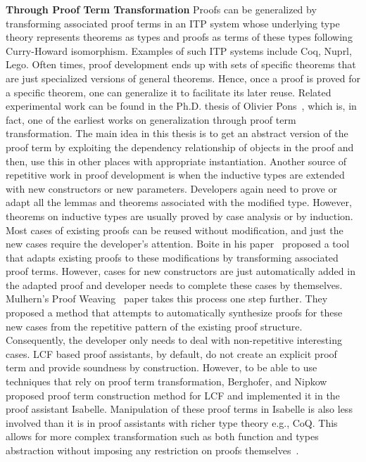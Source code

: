 \textbf{Through Proof Term Transformation} 
Proofs can be generalized by transforming associated proof terms in an ITP system whose underlying type theory represents theorems as types and proofs as terms of these types following Curry-Howard isomorphism. Examples of such ITP systems include Coq, Nuprl, Lego. Often times, proof development ends up with sets of specific theorems that are just specialized versions of general theorems. Hence, once a proof is proved for a specific theorem, one can generalize it to facilitate its later reuse. Related experimental work can be found in the Ph.D. thesis of Olivier Pons~\cite{Pons_1999}, which is, in fact, one of the earliest works on generalization through proof term transformation. The main idea in this thesis is to get an abstract version of the proof term by exploiting the dependency relationship of objects in the proof and then, use this in other places with appropriate instantiation. Another source of repetitive work in proof development is when the inductive types are extended with new constructors or new parameters. Developers again need to prove or adapt all the lemmas and theorems associated with the modified type. However, theorems on inductive types are usually proved by case analysis or by induction. Most cases of existing proofs can be reused without modification, and just the new cases require the developer's attention. Boite in his paper~\cite{Boite_2004} proposed a tool that adapts existing proofs to these modifications by transforming associated proof terms. However, cases for new constructors are just automatically added in the adapted proof and developer needs to complete these cases by themselves. Mulhern's Proof Weaving~\cite{Mulhern_2006} paper takes this process one step further. They proposed a method that attempts to automatically synthesize proofs for these new cases from the repetitive pattern of the existing proof structure. Consequently, the developer only needs to deal with non-repetitive interesting cases. LCF based proof assistants, by default, do not create an explicit proof term and provide soundness by construction. However, to be able to use techniques that rely on proof term transformation, Berghofer, and Nipkow~\cite{Berghofer_Nipkow_2002} proposed proof term construction method for LCF and implemented it in the proof assistant Isabelle. Manipulation of these proof terms in Isabelle is also less involved than it is in proof assistants with richer type theory e.g., CoQ. This allows for more complex transformation such as both function and types abstraction without imposing any restriction on proofs themselves~\cite{Boite_2004}. 

